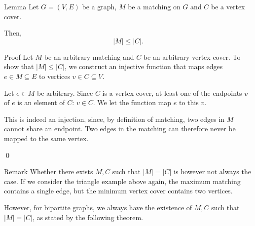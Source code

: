 \documentclass[a4paper]{article}
\begin{document}
\begin{parag}{Lemma}
    Let $G = \left(V, E\right)$ be a graph, $M$ be a matching on $G$ and $C$ be a vertex cover.

    Then, 
    \[\left|M\right| \leq \left|C\right|.\]
   
    \begin{subparag}{Proof}
        Let $M$ be an arbitrary matching and $C$ be an arbitrary vertex cover. To show that $\left|M\right| \leq \left|C\right|$, we construct an injective function that maps edges $e \in M \subseteq E$ to vertices $v \in C \subseteq V$. 

        Let $e \in M$ be arbitrary. Since $C$ is a vertex cover, at least one of the endpoints $v$ of $e$ is an element of $C$: $v \in C$. We let the function map $e$ to this $v$.

        This is indeed an injection, since, by definition of matching, two edges in $M$ cannot share an endpoint. Two edges in the matching can therefore never be mapped to the same vertex.

        \qed
    \end{subparag}
    
    \begin{subparag}{Remark}
        Whether there exists $M, C$ such that $\left|M\right| = \left|C\right|$ is however not always the case. If we consider the triangle example above again, the maximum matching contains a single edge, but the minimum vertex cover contains two vertices. 

        However, for bipartite graphs, we always have the existence of $M, C$ such that $\left|M\right| = \left|C\right|$, as stated by the following theorem.
    \end{subparag}
\end{parag}
\end{document}

